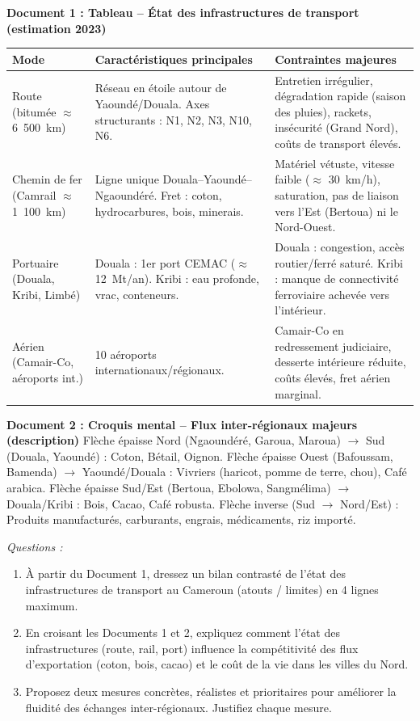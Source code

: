 \documentclass[11pt]{article}
\begin{document}
\begin{exercice}
\textbf{Document 1 : Tableau -- État des infrastructures de transport (estimation 2023)}
\begin{center}
\begin{tabularx}{\linewidth}{|l|X|X|}\hline
\textbf{Mode} & \textbf{Caractéristiques principales} & \textbf{Contraintes majeures} \\ \hline
Route (bitumée $\approx$ 6~500~km) & Réseau en étoile autour de Yaoundé/Douala. Axes structurants : N1, N2, N3, N10, N6. & Entretien irrégulier, dégradation rapide (saison des pluies), rackets, insécurité (Grand Nord), coûts de transport élevés. \\ \hline
Chemin de fer (Camrail $\approx$ 1~100~km) & Ligne unique Douala--Yaoundé--Ngaoundéré. Fret : coton, hydrocarbures, bois, minerais. & Matériel vétuste, vitesse faible ($\approx$ 30~km/h), saturation, pas de liaison vers l'Est (Bertoua) ni le Nord-Ouest. \\ \hline
Portuaire (Douala, Kribi, Limbé) & Douala : 1er port CEMAC ($\approx$ 12~Mt/an). Kribi : eau profonde, vrac, conteneurs. & Douala : congestion, accès routier/ferré saturé. Kribi : manque de connectivité ferroviaire achevée vers l'intérieur. \\ \hline
Aérien (Camair-Co, aéroports int.) & 10 aéroports internationaux/régionaux. & Camair-Co en redressement judiciaire, desserte intérieure réduite, coûts élevés, fret aérien marginal. \\ \hline
\end{tabularx}
\end{center}

\textbf{Document 2 : Croquis mental -- Flux inter-régionaux majeurs (description)}
Flèche épaisse Nord (Ngaoundéré, Garoua, Maroua) $\rightarrow$ Sud (Douala, Yaoundé) : Coton, Bétail, Oignon.
Flèche épaisse Ouest (Bafoussam, Bamenda) $\rightarrow$ Yaoundé/Douala : Vivriers (haricot, pomme de terre, chou), Café arabica.
Flèche épaisse Sud/Est (Bertoua, Ebolowa, Sangmélima) $\rightarrow$ Douala/Kribi : Bois, Cacao, Café robusta.
Flèche inverse (Sud $\rightarrow$ Nord/Est) : Produits manufacturés, carburants, engrais, médicaments, riz importé.

\emph{Questions :}
\begin{enumerate}
    \item À partir du Document 1, dressez un bilan contrasté de l'état des infrastructures de transport au Cameroun (atouts / limites) en 4 lignes maximum.
    \item En croisant les Documents 1 et 2, expliquez comment l'état des infrastructures (route, rail, port) influence la compétitivité des flux d'exportation (coton, bois, cacao) et le coût de la vie dans les villes du Nord.
    \item Proposez deux mesures concrètes, réalistes et prioritaires pour améliorer la fluidité des échanges inter-régionaux. Justifiez chaque mesure.
\end{enumerate}
\end{exercice}
\end{document}
